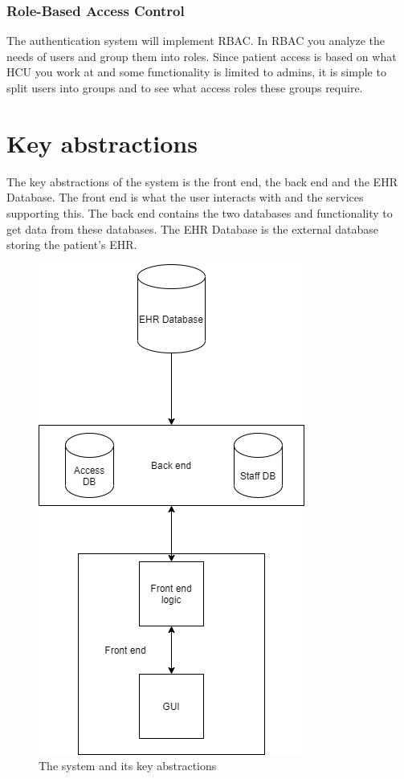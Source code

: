 \documentclass{article}
\begin{document}
\subsubsection{Role-Based Access Control}
The authentication system will implement RBAC. In RBAC you analyze the needs of users and group them into roles. Since patient access is based on what HCU you work at and some functionality is limited to admins, it is simple to split users into groups and to see what access roles these groups require.


\section{Key abstractions}
The key abstractions of the system is the front end, the back end and the EHR Database. The front end is what the user interacts with and the services supporting this. The back end contains the two databases and functionality to get data from these databases. The EHR Database is the external database storing the patient's EHR.

\begin{figure}[h]
    \centering
    \includegraphics[scale = 0.5]{key-abstraction}
    \caption{The system and its key abstractions}
    \label{fig:key-abstractions}
\end{figure}
\end{document}
